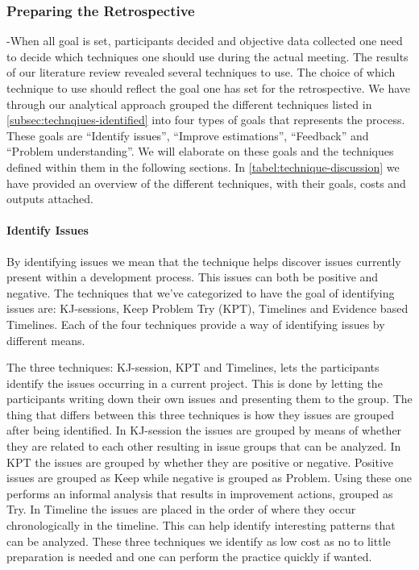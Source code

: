 \documentclass[12pt]{article}
\begin{document}
\subsubsection{Preparing the Retrospective} \label{subsec:which-techniques}
-When all goal is set, participants decided and objective data collected one need to decide which techniques one should use during the actual meeting. The results of our literature review revealed several techniques to use. The choice of which technique to use should reflect the goal one has set for the retrospective. We have through our analytical approach grouped the different techniques listed in \autoref{subsec:technqiues-identified} into four types of goals that represents the process. These goals are ``Identify issues'', ``Improve estimations'', ``Feedback'' and ``Problem understanding''. We will elaborate on these goals and the techniques defined within them in the following sections. In \autoref{tabel:technique-discussion} we have provided an overview of the different techniques, with their goals, costs and outputs attached. 

\paragraph{Identify Issues}
By identifying issues we mean that the technique helps discover issues currently present within a development process. This issues can both be positive and negative. The techniques that we've categorized to have the goal of identifying issues are: KJ-sessions, Keep Problem Try (KPT), Timelines and Evidence based Timelines. Each of the four techniques provide a way of identifying issues by different means.

The three techniques: KJ-session, KPT and Timelines, lets the participants identify the issues occurring in a current project. This is done by letting the participants writing down their own issues and presenting them to the group. The thing that differs between this three techniques is how they issues are grouped after being identified. In KJ-session the issues are grouped by means of whether they are related to each other resulting in issue groups that can be analyzed. In KPT the issues are grouped by whether they are positive or negative. Positive issues are grouped as Keep while negative is grouped as Problem. Using these one performs an informal analysis that results in improvement actions, grouped as Try. In Timeline the issues are placed in the order of where they occur  chronologically in the timeline. This can help identify interesting patterns that can be analyzed. These three techniques we identify as low cost as no to little preparation is needed and one can perform the practice quickly if wanted. 
\end{document}
